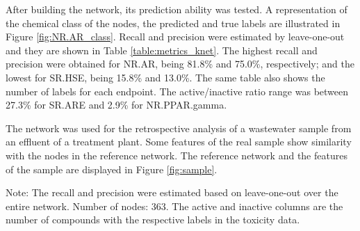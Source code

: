 After building the network, its prediction ability was tested. A representation of the chemical class of the nodes, the predicted and true labels are illustrated in Figure \ref{fig:NR.AR_class}. Recall and precision were estimated by leave-one-out and they are shown in Table \ref{table:metrics_knet}.  The highest recall and precision were obtained for NR.AR, being 81.8\% and 75.0\%, respectively; and the lowest for SR.HSE, being 15.8\% and 13.0\%. The same table also shows the number of labels for each endpoint. The active/inactive ratio range was between 27.3\% for SR.ARE and 2.9\% for NR.PPAR.gamma.

The network was used for the retrospective analysis of a wastewater sample from an effluent of a treatment plant. Some features of the real sample show similarity with the nodes in the reference network. The reference network and the \tMS{} features of the sample are displayed in Figure \ref{fig:sample}.

\begin{table}[h]
\centering
\footnotesize
{}
\caption*{Note: The recall and precision were estimated based on leave-one-out over the entire network. Number of nodes: 363. The active and inactive columns are the number of compounds with the respective labels in the toxicity data.}
\end{table}

